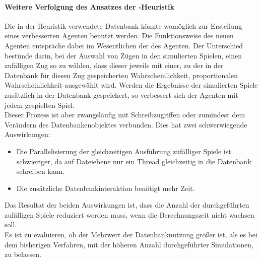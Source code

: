 \paragraph{Weitere Verfolgung des Ansatzes der -Heuristik}
Die in der  Heuristik verwendete Datenbank könnte womöglich zur Erstellung eines verbesserten Agenten benutzt werden. Die Funktionsweise des neuen Agenten entspräche dabei im Wesentlichen der des \mxZitat{\mc} Agenten. Der Unterschied bestünde darin, bei der Auswahl von Zügen in den simulierten Spielen, einen zufälligen Zug so zu wählen, dass dieser jeweils mit einer, zu der in der Datenbank für diesen Zug gespeicherten Wahrscheinlichkeit, proportionalen Wahrscheinlichkeit ausgewählt wird. Werden die Ergebnisse der simulierten Spiele zusätzlich in der Datenbank gespeichert, so verbessert sich der Agenten mit jedem gespielten Spiel.
\\Dieser Prozess ist aber zwangsläufig mit Schreibzugriffen oder zumindest dem Verändern des Datenbankenobjektes verbunden. Dies hat zwei schwerwiegende Auswirkungen:
\begin{itemize}
\item Die Parallelisierung der gleichzeitigen Ausführung zufälliger Spiele ist schwieriger, da auf Dateiebene nur ein Thread gleichzeitig in die Datenbank schreiben kann.
\item Die zusätzliche Datenbankinteraktion benötigt mehr Zeit.
\end{itemize}
Das Resultat der beiden Auswirkungen ist, dass die Anzahl der durchgeführten zufälligen Spiele reduziert werden muss, wenn die Berechnungszeit nicht wachsen soll.
\\Es ist zu evaluieren, ob der Mehrwert der Datenbanknutzung größer ist, als es bei dem bisherigen Verfahren, mit der höheren Anzahl durchgeführter Simulationen, zu belassen.
